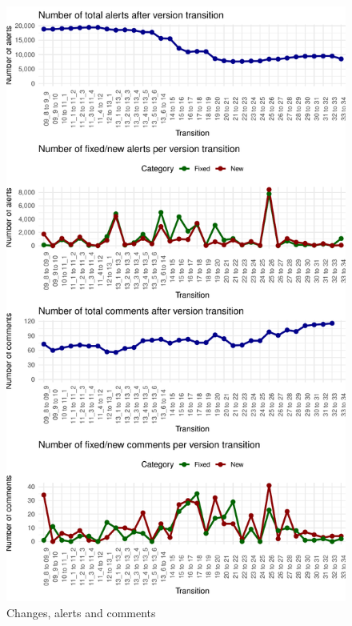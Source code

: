 \documentclass[
]{article}
\begin{document}
\begin{figure}
\centering
\includegraphics{report_files/figure-latex/unnamed-chunk-20-1.pdf}
\caption{\label{timeseries}Changes, alerts and comments}
\end{figure}

\normalsize

\newpage

\small

\normalsize

\end{document}
